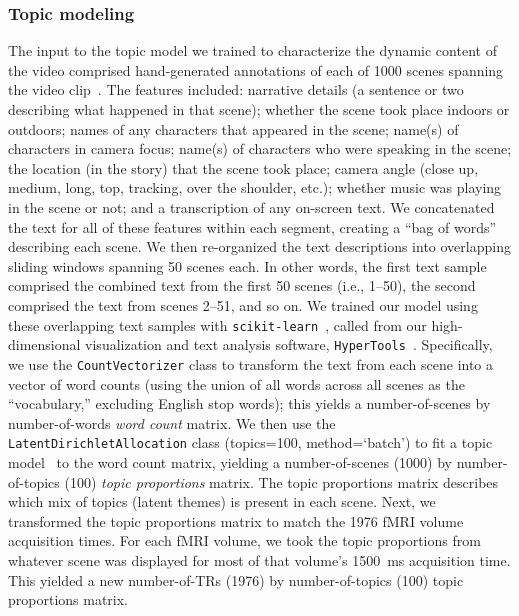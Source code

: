 \documentclass{article}
\begin{document}
\subsubsection*{Topic modeling}
The input to the topic model we trained to characterize the dynamic content of the video comprised hand-generated annotations of each of 1000 scenes spanning the video clip~\citep[generated by][]{ChenEtal17}.  The features included: narrative details (a sentence or two describing what happened in that scene); whether the scene took place indoors or outdoors; names of any characters that appeared in the scene; name(s) of characters in camera focus; name(s) of characters who were speaking in the scene; the location (in the story) that the scene took place; camera angle (close up, medium, long, top, tracking, over the shoulder, etc.); whether music was playing in the scene or not; and a transcription of any on-screen text.  We concatenated the text for all of these features within each segment, creating a ``bag of words'' describing each scene.  We then re-organized the text descriptions into overlapping sliding windows spanning 50 scenes each. In other words, the first text sample comprised the combined text from the first 50 scenes (i.e., 1--50), the second comprised the text from scenes 2--51, and so on.  We trained our model using these overlapping text samples with \texttt{scikit-learn}~\citep[version 0.19.1; ][]{PedrEtal11}, called from our high-dimensional visualization and text analysis software, \texttt{HyperTools}~\citep{HeusEtal18a}.  Specifically, we use the \texttt{CountVectorizer} class to transform the text from each scene into a vector of word counts (using the union of all words across all scenes as the ``vocabulary,'' excluding English stop words); this yields a number-of-scenes by number-of-words \textit{word count} matrix.  We then use the \texttt{LatentDirichletAllocation} class (topics=100, method=`batch') to fit a topic model~\citep{BleiEtal03} to the word count matrix, yielding a number-of-scenes (1000) by number-of-topics (100) \textit{topic proportions} matrix.  The topic proportions matrix describes which mix of topics (latent themes) is present in each scene.  Next, we transformed the topic proportions matrix to match the 1976 fMRI volume acquisition times.  For each fMRI volume, we took the topic proportions from whatever scene was displayed for most of that volume's 1500~ms acquisition time.  This yielded a new number-of-TRs (1976) by number-of-topics (100) topic proportions matrix.
\end{document}
